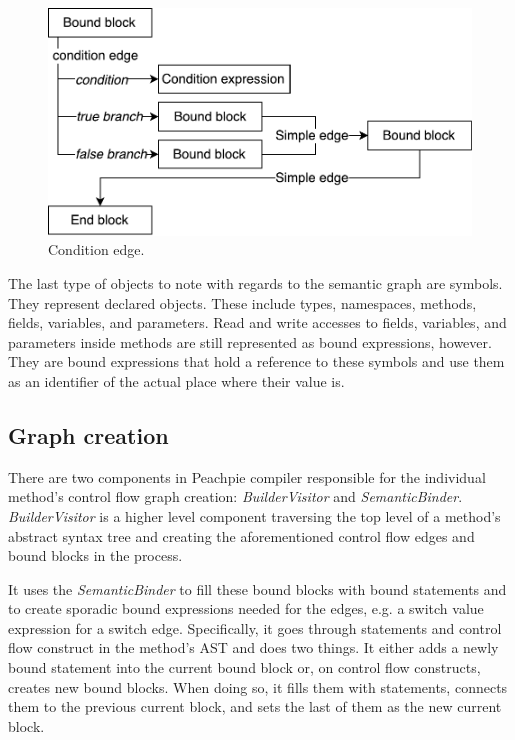 \begin{figure}[h]
	\centering	
	\includegraphics[scale=0.75]{../img/3_3_blocksedges}	
	\caption{Condition edge.}
	\label{fig3.3:Edges}
\end{figure}

The last type of objects to note with regards to the semantic graph are symbols. They represent declared objects. These include types, namespaces, methods, fields, variables, and parameters. Read and write accesses to fields, variables, and parameters inside methods are still represented as bound expressions, however. They are bound expressions that hold a reference to these symbols and use them as an identifier of the actual place where their value is.

\subsection{Graph creation}

There are two components in Peachpie compiler responsible for the individual method’s control flow graph creation: \emph{BuilderVisitor} and \emph{SemanticBinder}. \emph{BuilderVisitor} is a higher level component traversing the top level of a method’s abstract syntax tree and creating the aforementioned control flow edges and bound blocks in the process. 

It uses the \emph{SemanticBinder} to fill these bound blocks with bound statements and to create sporadic bound expressions needed for the edges, e.g. a switch value expression for a switch edge. Specifically, it goes through statements and control flow construct in the method’s AST and does two things. It either adds a newly bound statement into the current bound block or, on control flow constructs, creates new bound blocks. When doing so, it fills them with statements, connects them to the previous current block, and sets the last of them as the new current block.

